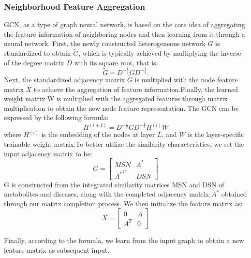 \documentclass[a4paper,fleqn]{cas-dc}
\begin{document}
\subsubsection{Neighborhood Feature Aggregation}
GCN\cite{kipf2017semisupervisedclassificationgraphconvolutional}, as a type of graph neural network, is based on the core idea of aggregating the feature information of neighboring nodes and then learning from it through a neural network. First, the newly constructed heterogeneous network \(G\) is standardized to obtain \( \tilde{G} \), which is typically achieved by multiplying the inverse of the degree matrix \( D \) with its square root, that is:
\begin{equation}
	\tilde{G} = D^{-\frac{1}{2}} G D^{-\frac{1}{2}}.
\end{equation}
Next, the standardized adjacency matrix \( \tilde{G} \) is multiplied with the node feature matrix \( X \) to achieve the aggregation of feature information.Finally, the learned weight matrix W is multiplied with the aggregated features through matrix multiplication to obtain the new node feature representation. The GCN can be expressed by the following formula:
\begin{equation}
	H^{(l+1)} = D^{-\frac{1}{2}} G D^{-\frac{1}{2}} H^{(l)} W
\end{equation}
where \( H^{(l)} \) is the embedding of the nodes at layer \( L \), and \( W \) is the layer-specific trainable weight matrix.To better utilize the similarity characteristics, we set the input adjacency matrix to be:
\begin{equation}
	G = \begin{bmatrix} MSN & A^* \\ {A^*}^T & DSN \end{bmatrix}	
\end{equation}
G is constructed from the integrated similarity matrices MSN and DSN of metabolites and diseases, along with the completed adjacency matrix \(A^*\) obtained through our matrix completion process. We then initialize the feature matrix as:
\begin{equation}
	X = \begin{bmatrix} 0 & A \\ A^T & 0 \end{bmatrix}	
\end{equation}

Finally, according to the formula, we learn from the input graph to obtain a new feature matrix as subsequent input.
\end{document}
